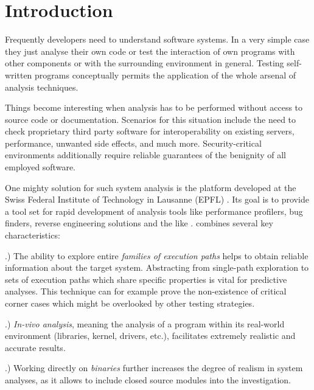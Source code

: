 \bigskip

\section{Introduction}


Frequently developers need to understand software systems.
In a very simple case they just analyse their own code or test the interaction of own programs with other components or with the surrounding environment in general.
Testing self-written programs conceptually permits the application of the whole arsenal of analysis techniques.


Things become interesting when analysis has to be performed without access to source code or documentation.
Scenarios for this situation include the need to check proprietary third party software for interoperability on existing servers, performance, unwanted side effects, and much more.
Security-critical environments additionally require reliable guarantees of the benignity of all employed software.


One mighty solution for such system analysis is the \sse platform developed at the Swiss Federal Institute of Technology in Lausanne (EPFL) \cite{chip11s2e}.
Its goal is to provide a tool set for rapid development of analysis tools like performance profilers, bug finders, reverse engineering solutions and the like \cite{chip12s2e}.
\sse combines several key characteristics:

.) The ability to explore entire \textit{families of execution paths} helps to obtain reliable information about the target system.
Abstracting from single-path exploration to sets of execution paths which share specific properties is vital for predictive analyses.
This technique can for example prove the non-existence of critical corner cases which might be overlooked by other testing strategies.

.) \textit{In-vivo analysis}, meaning the analysis of a program within its real-world environment (libraries, kernel, drivers, etc.), facilitates extremely realistic and accurate results.

.) Working directly on \textit{binaries} further increases the degree of realism in system analyses, as it allows to include closed source modules into the investigation.

